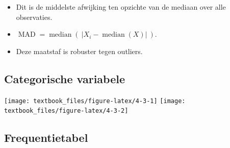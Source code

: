 \documentclass[]{tufte-book}
\providecommand{\tightlist}{%
  \setlength{\itemsep}{0pt}\setlength{\parskip}{0pt}}
\begin{document}
\begin{itemize}
  \begin{itemize}
  \tightlist
  \item
    Dit is de middelste afwijking ten opzichte van de mediaan over alle observaties.
  \item
    \(\operatorname{MAD} = \operatorname{median}\left(\ \left| X_{i} - \operatorname{median} (X) \right|\ \right)\).
  \item
    Deze maatstaf is robuster tegen outliers.
  \end{itemize}
\end{itemize}

\begin{table}

\caption{\label{tab:4-10}Afstand (spreidingsmaten)}
\centering
{}
\end{table}

\hypertarget{categorische-variabele-1}{%
\subsection{Categorische variabele}\label{categorische-variabele-1}}

\texttt{[image: textbook\_files/figure-latex/4-3-1]}
\texttt{[image: textbook\_files/figure-latex/4-3-2]}

\hypertarget{frequentietabel}{%
\subsection*{Frequentietabel}\label{frequentietabel}}
\end{document}

